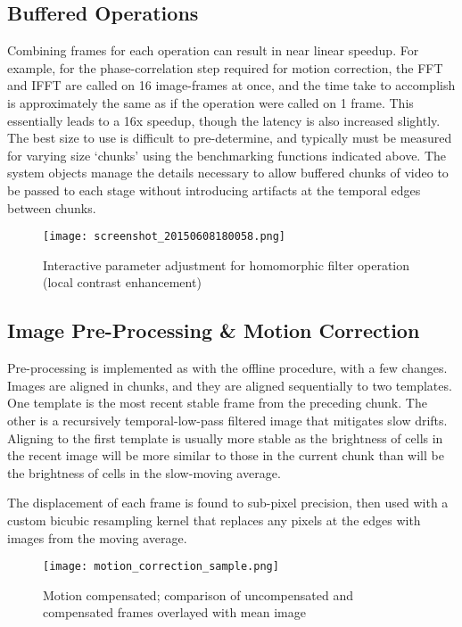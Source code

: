 \documentclass[../main.tex]{subfiles}
\begin{document}
\subsection{Buffered Operations}\label{sec:buffered-operations}

Combining frames for each operation can result in near linear speedup.
For example, for the phase-correlation step required for motion correction, the FFT and IFFT are called on 16 image-frames at once, and the time take to accomplish is approximately the same as if the operation were called on 1 frame.
This essentially leads to a 16x speedup, though the latency is also increased slightly.
The best size to use is difficult to pre-determine, and typically must be measured for varying size `chunks' using the benchmarking functions indicated above.
The system objects manage the details necessary to allow buffered chunks of video to be passed to each stage without introducing artifacts at the temporal edges between chunks.

\begin{figure}[htb]\centering
	\texttt{[image: screenshot\_20150608180058.png]}
	\caption{Interactive parameter adjustment for homomorphic filter operation (local contrast enhancement)}
\end{figure}

\subsection{Image Pre-Processing \& Motion Correction}\label{sec:image-pre-processing-motion-correction}

Pre-processing is implemented as with the offline procedure, with a few changes.
Images are aligned in chunks, and they are aligned sequentially to two templates.
One template is the most recent stable frame from the preceding chunk.
The other is a recursively temporal-low-pass filtered image that mitigates slow drifts.
Aligning to the first template is usually more stable as the brightness of cells in the recent image will be more similar to those in the current chunk than will be the brightness of cells in the slow-moving average.

The displacement of each frame is found to sub-pixel precision, then used with a custom bicubic resampling kernel that replaces any pixels at the edges with images from the moving average.



\begin{figure}[htb]\centering
	\texttt{[image: motion\_correction\_sample.png]}
	\caption{Motion compensated; comparison of uncompensated and compensated frames overlayed with mean image}
\end{figure}
\end{document}
